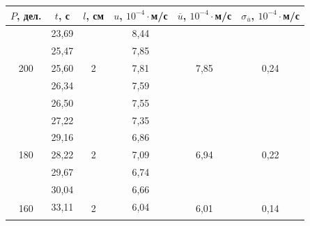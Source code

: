 \documentclass[a4paper, 12pt]{article}
\begin{document}
        \begin{table}[H]
            \centering
            \begin{tabular}{|c|ccccc|}
            \hline
            $P$, дел. & \multicolumn{1}{c|}{$t$, с} & \multicolumn{1}{c|}{$l$, см} & \multicolumn{1}{c|}{$u$, $10^{-4} \cdot$м/с} & \multicolumn{1}{c|}{$\overline{u}$, $10^{-4} \cdot$м/с} & $\sigma_{\overline{u}}$, $10^{-4} \cdot$м/с \\ \hline
            \multirow{5}{*}{200} & \multicolumn{1}{c|}{23,69} & \multicolumn{1}{c|}{\multirow{5}{*}{2}} & \multicolumn{1}{c|}{8,44} & \multicolumn{1}{c|}{\multirow{5}{*}{7,85}} & \multirow{5}{*}{0,24} \\ \cline{2-2} \cline{4-4}
             & \multicolumn{1}{c|}{25,47} & \multicolumn{1}{c|}{} & \multicolumn{1}{c|}{7,85} & \multicolumn{1}{c|}{} &  \\ \cline{2-2} \cline{4-4}
             & \multicolumn{1}{c|}{25,60} & \multicolumn{1}{c|}{} & \multicolumn{1}{c|}{7,81} & \multicolumn{1}{c|}{} &  \\ \cline{2-2} \cline{4-4}
             & \multicolumn{1}{c|}{26,34} & \multicolumn{1}{c|}{} & \multicolumn{1}{c|}{7,59} & \multicolumn{1}{c|}{} &  \\ \cline{2-2} \cline{4-4}
             & \multicolumn{1}{c|}{26,50} & \multicolumn{1}{c|}{} & \multicolumn{1}{c|}{7,55} & \multicolumn{1}{c|}{} &  \\ \hline
            \multirow{5}{*}{180} & \multicolumn{1}{c|}{27,22} & \multicolumn{1}{c|}{\multirow{5}{*}{2}} & \multicolumn{1}{c|}{7,35} & \multicolumn{1}{c|}{\multirow{5}{*}{6,94}} & \multirow{5}{*}{0,22} \\ \cline{2-2} \cline{4-4}
             & \multicolumn{1}{c|}{29,16} & \multicolumn{1}{c|}{} & \multicolumn{1}{c|}{6,86} & \multicolumn{1}{c|}{} &  \\ \cline{2-2} \cline{4-4}
             & \multicolumn{1}{c|}{28,22} & \multicolumn{1}{c|}{} & \multicolumn{1}{c|}{7,09} & \multicolumn{1}{c|}{} &  \\ \cline{2-2} \cline{4-4}
             & \multicolumn{1}{c|}{29,67} & \multicolumn{1}{c|}{} & \multicolumn{1}{c|}{6,74} & \multicolumn{1}{c|}{} &  \\ \cline{2-2} \cline{4-4}
             & \multicolumn{1}{c|}{30,04} & \multicolumn{1}{c|}{} & \multicolumn{1}{c|}{6,66} & \multicolumn{1}{c|}{} &  \\ \hline
            \multirow{5}{*}{160} & \multicolumn{1}{c|}{33,11} & \multicolumn{1}{c|}{\multirow{5}{*}{2}} & \multicolumn{1}{c|}{6,04} & \multicolumn{1}{c|}{\multirow{5}{*}{6,01}} & \multirow{5}{*}{0,14} \\ \cline{2-2} \cline{4-4}

\end{tabular}
\end{table}
\end{document}
